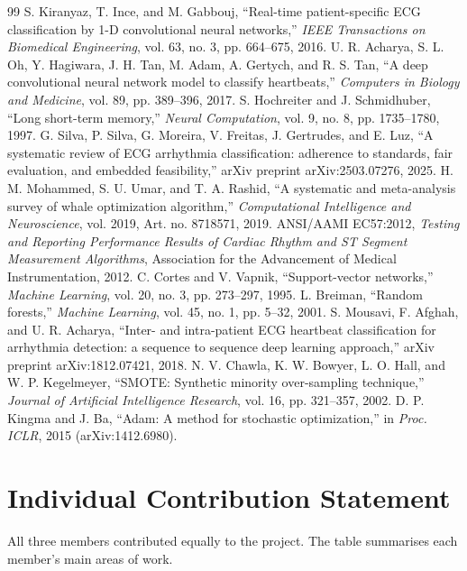 \documentclass[11pt,a4paper]{article}
\begin{document}
\begin{thebibliography}{99}
 S. Kiranyaz, T. Ince, and M. Gabbouj, ``Real-time patient-specific ECG classification by 1-D convolutional neural networks,'' \textit{IEEE Transactions on Biomedical Engineering}, vol. 63, no. 3, pp. 664--675, 2016.
 U. R. Acharya, S. L. Oh, Y. Hagiwara, J. H. Tan, M. Adam, A. Gertych, and R. S. Tan, ``A deep convolutional neural network model to classify heartbeats,'' \textit{Computers in Biology and Medicine}, vol. 89, pp. 389--396, 2017.
 S. Hochreiter and J. Schmidhuber, ``Long short-term memory,'' \textit{Neural Computation}, vol. 9, no. 8, pp. 1735--1780, 1997.
 G. Silva, P. Silva, G. Moreira, V. Freitas, J. Gertrudes, and E. Luz, ``A systematic review of ECG arrhythmia classification: adherence to standards, fair evaluation, and embedded feasibility,'' arXiv preprint arXiv:2503.07276, 2025.
 H. M. Mohammed, S. U. Umar, and T. A. Rashid, ``A systematic and meta-analysis survey of whale optimization algorithm,'' \textit{Computational Intelligence and Neuroscience}, vol. 2019, Art. no. 8718571, 2019.
 ANSI/AAMI EC57:2012, \textit{Testing and Reporting Performance Results of Cardiac Rhythm and ST Segment Measurement Algorithms}, Association for the Advancement of Medical Instrumentation, 2012.
 C. Cortes and V. Vapnik, ``Support-vector networks,'' \textit{Machine Learning}, vol. 20, no. 3, pp. 273--297, 1995.
 L. Breiman, ``Random forests,'' \textit{Machine Learning}, vol. 45, no. 1, pp. 5--32, 2001.
 S. Mousavi, F. Afghah, and U. R. Acharya, ``Inter- and intra-patient ECG heartbeat classification for arrhythmia detection: a sequence to sequence deep learning approach,'' arXiv preprint arXiv:1812.07421, 2018.
 N. V. Chawla, K. W. Bowyer, L. O. Hall, and W. P. Kegelmeyer, ``SMOTE: Synthetic minority over-sampling technique,'' \textit{Journal of Artificial Intelligence Research}, vol. 16, pp. 321--357, 2002.
 D. P. Kingma and J. Ba, ``Adam: A method for stochastic optimization,'' in \textit{Proc. ICLR}, 2015 (arXiv:1412.6980).
\end{thebibliography}

\newpage
\section*{Individual Contribution Statement}
All three members contributed equally to the project. The table summarises each member's main areas of work.
\end{document}
